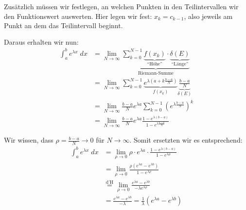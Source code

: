 Zusätzlich müssen wir festlegen, an welchen Punkten in den Teilintervallen wir
den Funktionswert auswerten. Hier legen wir fest: $x_k = c_{k-1}$, also
jeweils am Punkt an dem das Teilintervall beginnt.

Daraus erhalten wir nun:
\begin{align*}
\int_a^b e^{\lambda x}\;dx &= \lim_{N \to \infty} \underbrace{\sum_{k=0}^{N-1}
\underbrace{f(x_k)}_{\text{``Höhe''}} \cdot
\underbrace{\delta(E)}_{\text{``Länge''}}}_{\text{Riemann-Summe}}\\
&= \lim_{N \to \infty} \sum_{k=0}^{N-1} \underbrace{e^{\lambda (a +
k\frac{b-a}{N})}}_{f(x_k)} \underbrace{\frac{b-a}{N}}_{\delta(E)}\\
&= \lim_{N \to \infty} \frac{b-a}{N} e^{\lambda a} \sum_{k=0}^{N-1}(e^{\lambda
\frac{b-a}{N}})^k\\
&= \lim_{N \to \infty} \frac{b-a}{N} e^{\lambda a} \frac{1-e^{\lambda
(b-a)}}{1-e^{\lambda \frac{b-a}{N}}}
\end{align*}

Wir wissen, dass $\rho = \frac{b-a}{N} \to 0$ für $N \to \infty$. Somit
ersetzten wir es entsprechend:
\begin{align*}
\int_a^b e^{\lambda x}\;dx &= \lim_{\rho \to 0} \rho \cdot e^{\lambda a} \cdot
\frac{1-e^{\lambda(b-a)}}{1-e^{\lambda \rho}}\\
&= \lim_{\rho \to 0} \frac{\rho (e^{\lambda a} - e^{\lambda b})}{1-e^{\lambda
\rho}}\\
&\overset{\text{d'H}}= \lim_{\rho \to 0} \frac{e^{\lambda a} - e^{\lambda
b}}{-\lambda e^{\lambda \rho}}\\
&= \frac{e^{\lambda a} - e^{\lambda b}}{-\lambda} = \frac{1}{\lambda}(e^{\lambda
a} - e^{\lambda b})
\end{align*}
